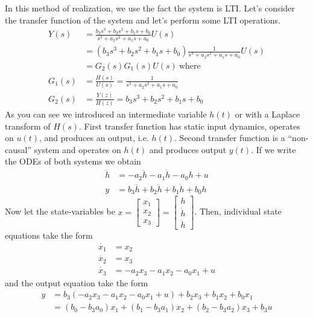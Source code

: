 \documentclass[twoside]{article}
\begin{document}
In this method of realization, we use the fact the system is
LTI. Let's consider the transfer function of the system and let's 
perform some LTI operations.
%
\begin{align*}
Y(s) &= \frac{ b_3 s^3 + b_2 s^2  + b_1 s + b_0 }{ s^3 + a_2 s^2 + a_1 s + a_0} U(s)
\\
&= \left( b_3 s^3 + b_2 s^2  + b_1 s + b_0 \right)  
\frac{1}{ s^3 + a_2 s^2 + a_1 s + a_0 } U(s) 
\\
&= G_2(s) G_1(s) U(s) \ \mathrm{where} 
\\
G_1(s) &= \frac{H(s)}{U(s)} = \frac{1}{ s^3 + a_2 s^2 + a_1 s + a_0 } 
\\
G_2(s) &= \frac{Y(z)}{H(z)} = b_3 s^3 + b_2 s^2  + b_1 s + b_0
\end{align*}
%
As you can see we introduced an intermediate variable $h(t)$ or with a
Laplace transform of $H(s)$. First transfer function has static input
dynamics, operates on $u(t)$, and produces an output, i.e. $h(t)$. 
Second transfer function is a ``non-causal'' system and operates on $h(t)$ and produces output
$y(t)$. If we write the ODEs of both systems we obtain
%
\begin{align*}
\dddot{h} &= -a_2 \ddot{h} - a_1 \dot{h} - a_0 h + u
\\
y &= b_3 \dddot{h} + b_2 \ddot{h} + b_1 \dot{h} + b_0 h
\end{align*}
%
Now let the state-variables be 
$x = \left[ \begin{array}{c} x_1 \\ x_2 \\ x_3 \end{array} \right] 
= \left[ \begin{array}{c} h \\ \dot{h} \\ \ddot{h} \end{array} \right]$. Then,
individual state equations take the form
%
\begin{align*}
\dot{x_1} &= x_2
\\
\dot{x_2} &= x_3
\\
\dot{x_3} &= -a_2 x_3 - a_1 x_2 - a_0 x_1 + u
\end{align*}
%
and the output equation take the form
%
\begin{align*}
y &= b_3\left( -a_2 x_3 - a_1 x_2 - a_0 x_1 + u \right) + b_2 x_3 +
    b_1 x_2 + b_0 x_1
\\
&= ( b_0 - b_3 a_0 ) x_1 + ( b_1 - b_3 a_1 ) x_2 + ( b_2 - b_3 a_2 ) x_3 + b_3 u
\end{align*}
\end{document}
